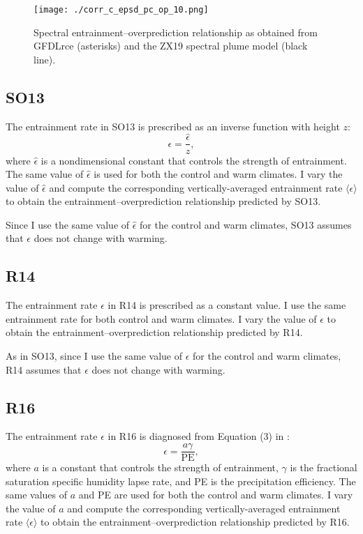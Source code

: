 \documentclass[11pt]{article}
\begin{document}
\begin{figure}[htbp]
\centering
\texttt{[image: ./corr\_c\_epsd\_pc\_op\_10.png]}
\caption{\label{fig:org4bb1748}Spectral entrainment--overprediction relationship as obtained from GFDLrce (asterisks) and the ZX19 spectral plume model (black line).}
\end{figure}

\subsection*{SO13}
\label{sec:orgab6736d}
The entrainment rate in SO13 is prescribed as an inverse function with height \(z\):
\begin{equation}
\epsilon = \frac{\hat{\epsilon}}{z},
\end{equation}
where \(\hat{\epsilon}\) is a nondimensional constant that controls the strength of entrainment. The same value of \(\hat{\epsilon}\) is used for both the control and warm climates. I vary the value of \(\hat{\epsilon}\) and compute the corresponding vertically-averaged entrainment rate \(\langle \epsilon \rangle\) to obtain the entrainment--overprediction relationship predicted by SO13.

Since I use the same value of \(\hat{\epsilon}\) for the control and warm climates, SO13 assumes that \(\epsilon\) does not change with warming.

\subsection*{R14}
\label{sec:org5107872}
The entrainment rate \(\epsilon\) in R14 is prescribed as a constant value. I use the same entrainment rate for both control and warm climates. I vary the value of \(\epsilon\) to obtain the entrainment--overprediction relationship predicted by R14.

As in SO13, since I use the same value of \(\epsilon\) for the control and warm climates, R14 assumes that \(\epsilon\) does not change with warming.

\subsection*{R16}
\label{sec:orga14851e}
The entrainment rate \(\epsilon\) in R16 is diagnosed from Equation (3) in \cite{romps2016}:
\begin{equation}
\label{eq:org951f6d2}
\epsilon = \frac{a \gamma}{\mathrm{PE}},
\end{equation}
where \(a\) is a constant that controls the strength of entrainment, \(\gamma\) is the fractional saturation specific humidity lapse rate, and PE is the precipitation efficiency. The same values of \(a\) and PE are used for both the control and warm climates. I vary the value of \(a\) and compute the corresponding vertically-averaged entrainment rate \(\langle \epsilon \rangle\) to obtain the entrainment--overprediction relationship predicted by R16.
\end{document}
